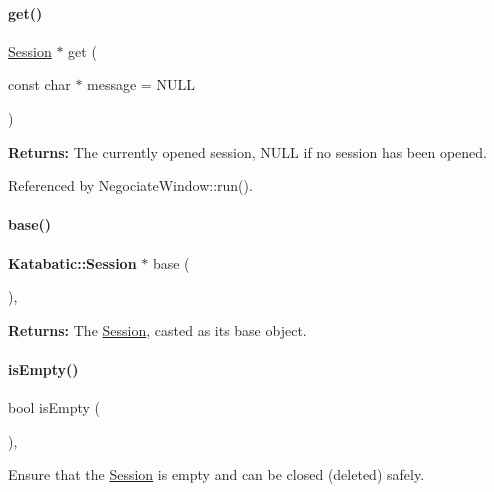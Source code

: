 \paragraph{\texorpdfstring{get()}{get()}}
{\footnotesize\ttfamily \mbox{\hyperlink{classKite_1_1Session}{Session}} $\ast$ get (\begin{DoxyParamCaption}\item[{const char $\ast$}]{message = {\ttfamily NULL} }\end{DoxyParamCaption})\hspace{0.3cm}{\ttfamily [static]}}

{\bfseries Returns\+:} The currently opened session, {\ttfamily N\+U\+LL} if no session has been opened. 

Referenced by Negociate\+Window\+::run().

\mbox{\label{classKite_1_1Session_a8a3fc782c34dc075bb2e14209e245494}} 
\paragraph{\texorpdfstring{base()}{base()}}
{\footnotesize\ttfamily \textbf{ Katabatic\+::\+Session} $\ast$ base (\begin{DoxyParamCaption}{ }\end{DoxyParamCaption})\hspace{0.3cm}{\ttfamily [inline]}, {\ttfamily [static]}}

{\bfseries Returns\+:} The \mbox{\hyperlink{classKite_1_1Session}{Session}}, casted as it\textquotesingle{}s base object. \mbox{\label{classKite_1_1Session_af337ffd75e4f019ce15302c60715d84b}} 
\paragraph{\texorpdfstring{is\+Empty()}{isEmpty()}}
{\footnotesize\ttfamily bool is\+Empty (\begin{DoxyParamCaption}{ }\end{DoxyParamCaption})\hspace{0.3cm}{\ttfamily [inline]}, {\ttfamily [static]}}

Ensure that the \mbox{\hyperlink{classKite_1_1Session}{Session}} is empty and can be closed (deleted) safely. 

